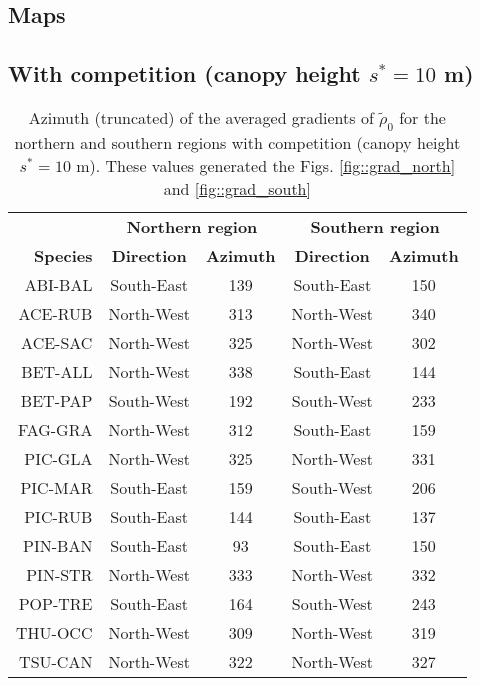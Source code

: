 \documentclass[letterpaper, 12pt]{article}
\newcommand {\s}{{s}^{*}}
\theoremstyle{theo}
\begin{document}
\tableofcontents
\listoftables
\listoffigures

\begin{refsection}
\begin{onehalfspace}
\section{Maps} \label{app::maps}
	\subsection{With competition (canopy height $ \s = 10 $ m)}
	\begin{table}[ht]
	\centering
	\caption[Azimuth ($ s^{*} = 10 $ m)]{Azimuth (truncated) of the averaged gradients of $ \tilde \rho_0 $ for the northern and southern regions with competition (canopy height $ \s = 10 $ m). These values generated the Figs. \ref{fig::grad_north} and \ref{fig::grad_south} \label{tab::azimuth}}
	\begin{tabular}{rcccc}
		\toprule
			~ & \multicolumn{2}{c}{\textbf{Northern region}} & \multicolumn{2}{c}{\textbf{Southern region}} \\
			\cmidrule(lr){2-3} \cmidrule(lr){4-5}
			\textbf{Species} & \textbf{Direction} & \textbf{Azimuth} & \textbf{Direction} & \textbf{Azimuth} \\
		\midrule
			ABI-BAL & South-East & 139 & South-East & 150 \\
			ACE-RUB & North-West & 313 & North-West & 340 \\
			ACE-SAC & North-West & 325 & North-West & 302 \\
			BET-ALL & North-West & 338 & South-East & 144 \\
			BET-PAP & South-West & 192 & South-West & 233 \\
			FAG-GRA & North-West & 312 & South-East & 159 \\
			PIC-GLA & North-West & 325 & North-West & 331 \\
			PIC-MAR & South-East & 159 & South-West & 206 \\
			PIC-RUB & South-East & 144 & South-East & 137 \\
			PIN-BAN & South-East & 93 & South-East & 150 \\
			PIN-STR & North-West & 333 & North-West & 332 \\
			POP-TRE & South-East & 164 & South-West & 243 \\
			THU-OCC & North-West & 309 & North-West & 319 \\
			TSU-CAN & North-West & 322 & North-West & 327 \\
		\bottomrule
	\end{tabular}
	\end{table}
	

\end{onehalfspace}
\end{refsection}
\end{document}
